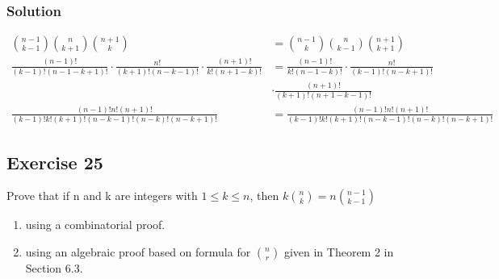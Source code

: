 \documentclass{article}
\theoremstyle{mytheoremstyle}
\theoremstyle{mytheoremstyle}
\theoremstyle{myproblemstyle}
\begin{document}
    \subsubsection*{Solution}
    \begin{align*}
        \binom{n - 1}{k - 1}\binom{n}{k+1}\binom{n+1}{k} &= \binom{n - 1}{k}\binom{n}{k - 1}\binom{n + 1}{k + 1}\\
        \frac{(n - 1)!}{(k - 1)!(n - 1 - k + 1)!}\cdot\frac{n!}{(k + 1)!(n - k - 1)!}\cdot\frac{(n+1)!}{k!(n + 1 - k)!} &= \frac{(n - 1)!}{k!(n - 1 - k)!}\cdot\frac{n!}{(k - 1)!(n - k + 1)!}\\ &\cdot\frac{(n+1)!}{(k + 1)!(n + 1 - k - 1)!}\\
        \frac{(n - 1)! n! (n+1)!}{(k -1)!k!(k+1)!(n - k - 1)!(n - k)!(n - k + 1)!} &= \frac{(n - 1)!n!(n+1)!}{(k - 1)!k!(k+1)!(n-k-1)!(n-k)!(n-k+1)!}
    \end{align*}
    \subsection*{Exercise 25}
    Prove that if n and k are integers with \(1 \leq k \leq n\), then \(k\binom{n}{k} = n\binom{n - 1}{k - 1}\)
    \begin{enumerate} [label = (\alph*)]
        \item using a combinatorial proof.
        \item using an algebraic proof based on formula for \(\binom{n}{r}\) given in Theorem 2 in Section 6.3.
    \end{enumerate}
\end{document}
